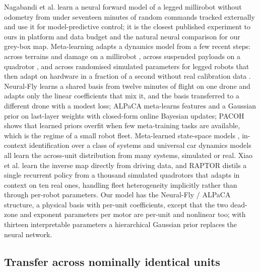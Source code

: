 Nagabandi et al. \cite{nagabandi2018millirobot} learn a neural forward
model of a legged millirobot without odometry from under seventeen
minutes of random commands tracked externally and use it for
model-predictive control; it is the closest published experiment to ours
in platform and data budget and the natural neural comparison for our
grey-box map. Meta-learning adapts a dynamics model from a few recent
steps: across terrains and damage on a millirobot
\cite{nagabandi2019adapt}, across suspended payloads on a quadrotor
\cite{belkhale2021payload}, and across randomised simulated parameters
for legged robots that then adapt on hardware in a fraction of a second
without real calibration data \cite{kumar2021rma}. Neural-Fly
\cite{oconnell2022neuralfly} learns a shared basis from twelve minutes
of flight on one drone and adapts only the linear coefficients that mix
it, and the basis transferred to a different drone with a modest loss;
ALPaCA \cite{harrison2018alpaca} meta-learns features and a Gaussian
prior on last-layer weights with closed-form online Bayesian updates;
PACOH \cite{rothfuss2021pacoh} shows that learned priors overfit when
few meta-training tasks are available, which is the regime of a small
robot fleet. Meta-learned state-space models
\cite{chakrabarty2023meta}, in-context identification over a class of
systems \cite{forgione2023incontext} and universal car dynamics models
\cite{xiao2024anycar} all learn the across-unit distribution from many
systems, simulated or real. Xiao et al. \cite{xiao2021ikd} learn the
inverse map directly from driving data, and RAPTOR
\cite{eschmann2025raptor} distils a single recurrent policy from a
thousand simulated quadrotors that adapts in context on ten real ones,
handling fleet heterogeneity implicitly rather than through per-robot
parameters. Our model has the Neural-Fly / ALPaCA structure, a physical
basis with per-unit coefficients, except that the two dead-zone and
exponent parameters per motor are per-unit and nonlinear too; with
thirteen interpretable parameters a hierarchical Gaussian prior replaces
the neural network.

\subsection{Transfer across nominally identical
units}\label{sec:rw-transfer}

